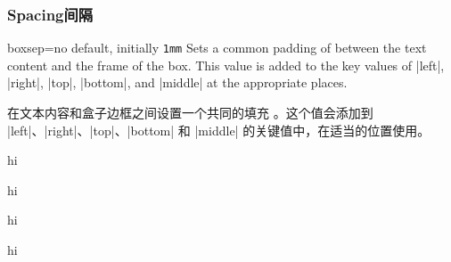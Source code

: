 \setcounter{section}{4}
\setcounter{subsection}{7}
\setcounter{subsubsection}{3}

\subsubsection{Spacing\hfill 间隔}
\begin{docTcbKey}{boxsep}{=}{no default, initially \texttt{1mm}}
Sets a common padding of  between the text content and the
frame of the box. This value is added to the key values of
|left|, |right|, |top|, |bottom|, and |middle| at the appropriate places.


在文本内容和盒子边框之间设置一个共同的填充 。这个值会添加到 |left|、|right|、|top|、|bottom| 和 |middle| 的关键值中，在适当的位置使用。

\begin{dispExample*}{}

\begin{tcolorbox}[boxsep=5mm,draft]
hi
\end{tcolorbox}
\begin{tcolorbox}[boxsep=8mm,draft]
hi
\end{tcolorbox}
\begin{tcolorbox}[boxsep=5mm]
hi
\end{tcolorbox}
\begin{tcolorbox}[boxsep=8mm]
hi
\end{tcolorbox}
\end{dispExample*}


\end{docTcbKey}
